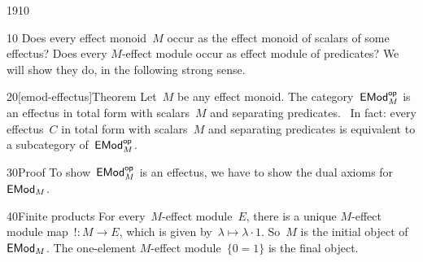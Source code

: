 \begin{parsec}{1910}%
\begin{point}{10}%
Does every effect monoid~$M$ occur as the effect monoid of scalars of some
    effectus?  Does every $M$-effect module occur as
        effect module of predicates?
We will show they do, in the following strong sense.
\end{point}
\begin{point}{20}[emod-effectus]{Theorem}%
    Let~$M$ be any effect monoid.
    The category~$\mathsf{EMod}^{\mathsf{op}}_M$ is an effectus in total form
        with scalars~$M$ and separating predicates.~\cite{effintro}
In fact: every effectus~$C$ in total form
    with scalars~$M$ and separating predicates
    is equivalent to a subcategory of~$\mathsf{EMod}^{\mathsf{op}}_M$.
\begin{point}{30}{Proof}%
To show~$\mathsf{EMod}^{\mathsf{op}}_M$ is an effectus,
    we have to show the dual  axioms for~$\mathsf{EMod}_M$.
\begin{point}{40}{Finite products}%
For every~$M$-effect module~$E$,
    there is a unique $M$-effect module map~$!\colon M \to E$,
    which is given by~$\lambda \mapsto \lambda \cdot 1$.
So~$M$ is the initial object of~$\mathsf{EMod}_M$.
The one-element $M$-effect module~$\{0=1\}$ is the final object.


\end{point}
\end{point}
\end{point}
\end{parsec}
